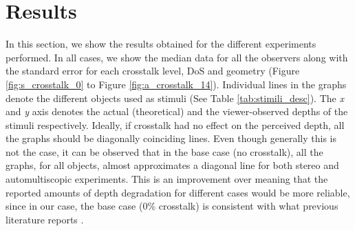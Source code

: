 \section{Results}

In this section, we show the results obtained for the different experiments performed. In all cases, we show the median data for all the observers along with the standard error for each crosstalk level, DoS and geometry (Figure \ref{fig:s_crosstalk_0} to Figure \ref{fig:a_crosstalk_14}). Individual lines in the graphs denote the different objects used as stimuli (See Table \ref{tab:stimili_desc}). The \emph{x} and \emph{y} axis denotes the actual (theoretical) and the viewer-observed depths of the stimuli respectively. Ideally, if crosstalk had no effect on the perceived depth, all the graphs should be diagonally coinciding lines. Even though generally this is not the case, it can be observed that in the base case (no crosstalk), all the graphs, for all objects, almost approximates a diagonal line for both stereo and automultiscopic experiments. This is an improvement over \cite{tsirlin2012effect} meaning that the reported amounts of depth degradation for different cases would be more reliable, since in our case, the base case (0\% crosstalk) is consistent with what previous literature reports \cite{palmisano2010stereoscopic}.

